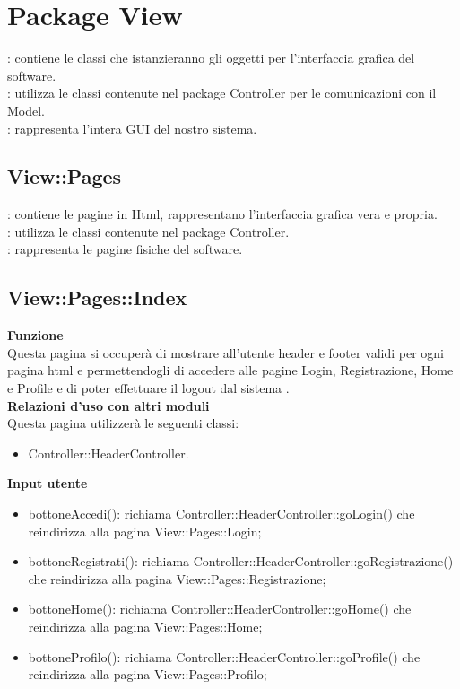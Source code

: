 \section{Package View}{
	\textbf{\tipo}: contiene le classi che istanzieranno gli oggetti per l'interfaccia grafica del software.\\
	\textbf{\relaz}: utilizza le classi contenute nel package Controller per le comunicazioni con il Model.\\
	\textbf{\attivita}: rappresenta l'intera GUI del nostro sistema.
\subsection{View::Pages}{
\textbf{\tipo}: contiene le pagine in Html, rappresentano l'interfaccia grafica vera e propria.\\
\textbf{\relaz}: utilizza le classi contenute nel package Controller.\\
\textbf{\attivita}: rappresenta le pagine fisiche del software.
}
\subsection{View::Pages::Index}{
	\textbf{Funzione}\\
		\indent Questa pagina si occuperà di mostrare all'utente header e footer validi per ogni pagina html e permettendogli di accedere alle pagine Login, Registrazione, Home e Profile e di poter effettuare il logout dal sistema .\\
	\textbf{Relazioni d'uso con altri moduli}\\
		\indent Questa pagina utilizzerà le seguenti classi:
	\begin{itemize}
		\item Controller::HeaderController.
	\end{itemize}
	\textbf{Input utente}
		\begin{itemize}
		\item bottoneAccedi(): richiama Controller::HeaderController::goLogin() che reindirizza alla pagina View::Pages::Login;
		\item bottoneRegistrati(): richiama Controller::HeaderController::goRegistrazione() che reindirizza alla pagina View::Pages::Registrazione;
		\item bottoneHome(): richiama Controller::HeaderController::goHome() che reindirizza alla pagina View::Pages::Home;
		\item bottoneProfilo(): richiama Controller::HeaderController::goProfile() che reindirizza alla pagina View::Pages::Profilo;
	\end{itemize}
	}
}
